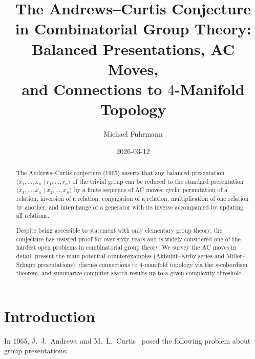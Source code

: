 \documentclass[12pt,a4paper]{amsart}
\theoremstyle{definition}
\theoremstyle{remark}
\begin{document}
\title{The Andrews--Curtis Conjecture\\
in Combinatorial Group Theory:\\
Balanced Presentations, AC Moves,\\
and Connections to $4$-Manifold Topology}

\author{Michael Fuhrmann}
\address{Specialist Mathematics Project, Build 166}
\date{2026-03-12}

\begin{abstract}
The Andrews--Curtis conjecture (1965) asserts that any balanced presentation
$\langle x_1,\ldots,x_n \mid r_1,\ldots,r_n \rangle$ of the trivial group can
be reduced to the standard presentation $\langle x_1,\ldots,x_n \mid x_1,\ldots,x_n \rangle$
by a finite sequence of AC moves: cyclic permutation of a relation, inversion of
a relation, conjugation of a relation, multiplication of one relation by another,
and interchange of a generator with its inverse accompanied by updating all relations.

Despite being accessible to statement with only elementary group theory, the
conjecture has resisted proof for over sixty years and is widely considered one
of the hardest open problems in combinatorial group theory. We survey the AC moves
in detail, present the main potential counterexamples (Akbulut--Kirby series and
Miller--Schupp presentations), discuss connections to $4$-manifold topology via
the $s$-cobordism theorem, and summarize computer search results up to a given
complexity threshold.
\end{abstract}

\maketitle

\tableofcontents

\section{Introduction}

In 1965, J.~J.\ Andrews and M.~L.\ Curtis~\cite{AC65} posed the following problem
about group presentations:
\end{document}
